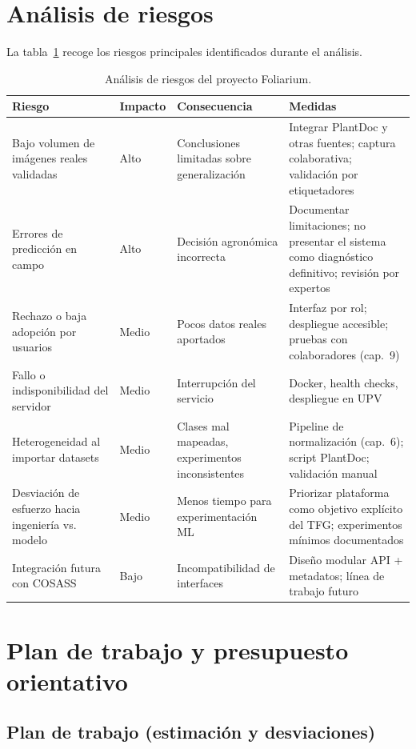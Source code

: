 \documentclass[11pt,spanish,listoffigures,listoftables]{tfgetsinf}
\begin{document}
\section{Análisis de riesgos}

La tabla~\ref{tab:riesgos} recoge los riesgos principales identificados durante el análisis.

\begin{table}[htbp]
\centering
\caption{Análisis de riesgos del proyecto Foliarium.}
\label{tab:riesgos}
\small
\begin{tabular}{p{3cm}p{2cm}p{3.5cm}p{5cm}}
\hline
\textbf{Riesgo} & \textbf{Impacto} & \textbf{Consecuencia} & \textbf{Medidas} \\
\hline
Bajo volumen de imágenes reales validadas & Alto & Conclusiones limitadas sobre generalización & Integrar PlantDoc y otras fuentes; captura colaborativa; validación por etiquetadores \\
Errores de predicción en campo & Alto & Decisión agronómica incorrecta & Documentar limitaciones; no presentar el sistema como diagnóstico definitivo; revisión por expertos \\
Rechazo o baja adopción por usuarios & Medio & Pocos datos reales aportados & Interfaz por rol; despliegue accesible; pruebas con colaboradores (cap.~9) \\
Fallo o indisponibilidad del servidor & Medio & Interrupción del servicio & Docker, health checks, despliegue en UPV \\
Heterogeneidad al importar datasets & Medio & Clases mal mapeadas, experimentos inconsistentes & Pipeline de normalización (cap.~6); script PlantDoc; validación manual \\
Desviación de esfuerzo hacia ingeniería vs. modelo & Medio & Menos tiempo para experimentación ML & Priorizar plataforma como objetivo explícito del TFG; experimentos mínimos documentados \\
Integración futura con COSASS & Bajo & Incompatibilidad de interfaces & Diseño modular API + metadatos; línea de trabajo futuro \\
\hline
\end{tabular}
\end{table}

\section{Plan de trabajo y presupuesto orientativo}

\subsection{Plan de trabajo (estimación y desviaciones)}
\end{document}
